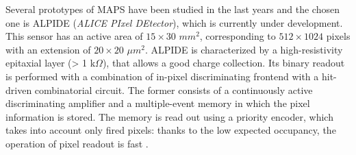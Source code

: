Several prototypes of MAPS have been studied in the last years and the chosen one is ALPIDE (\textit{ALICE PIxel DEtector}), which is currently under development. This sensor has an active area of $15\times30 $ $mm^2$, corresponding to $512 \times 1024$ pixels with an extension of $20\times20$ $\mu m^2$. ALPIDE is characterized by a high-resistivity epitaxial layer (> 1 k$\Omega$), that allows a good charge collection. Its binary readout is performed with a combination of in-pixel discriminating frontend with a hit-driven combinatorial circuit. The former consists of a continuously active discriminating amplifier and a multiple-event memory in which the pixel information is stored. The memory is read out using a priority encoder, which takes into account only fired pixels: thanks to the low expected occupancy, the operation of pixel readout is fast \cite{alpide}.
